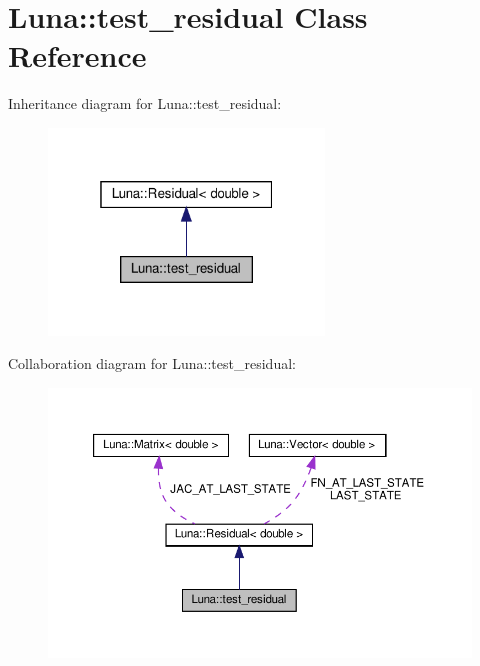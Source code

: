 \hypertarget{classLuna_1_1test__residual}{}\section{Luna\+:\+:test\+\_\+residual Class Reference}
\label{classLuna_1_1test__residual}


Inheritance diagram for Luna\+:\+:test\+\_\+residual\+:\nopagebreak
\begin{figure}[H]
\begin{center}
\leavevmode
\includegraphics[width=208pt]{classLuna_1_1test__residual__inherit__graph}
\end{center}
\end{figure}


Collaboration diagram for Luna\+:\+:test\+\_\+residual\+:\nopagebreak
\begin{figure}[H]
\begin{center}
\leavevmode
\includegraphics[width=350pt]{classLuna_1_1test__residual__coll__graph}
\end{center}
\end{figure}
